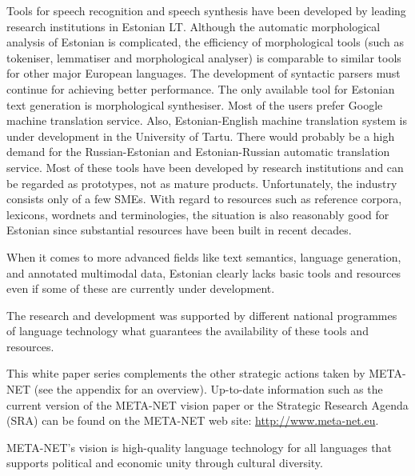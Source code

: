 \begin{multicols}{2}
Tools for speech recognition and speech synthesis have been developed by leading research institutions in Estonian LT.  Although the automatic morphological analysis of Estonian is complicated, the efficiency of morphological tools (such as tokeniser, lemmatiser and morphological analyser) is comparable to similar tools for other major European languages.  The development of syntactic parsers must continue for achieving better performance.  The only available tool for Estonian text generation is morphological synthesiser.  Most of the users prefer Google machine translation service. Also, Estonian-English machine translation system is under development in the University of Tartu. There would probably be a high demand for the Russian-Estonian and Estonian-Russian automatic translation service.  Most of these tools have been developed by research institutions and can be regarded as prototypes, not as mature products. Unfortunately, the industry consists only of a few SMEs.  With regard to resources such as reference corpora, lexicons, wordnets and terminologies, the situation is also reasonably good for Estonian since substantial resources have been built in recent decades.

When it comes to more advanced fields like text semantics, language generation, and annotated multimodal data, Estonian clearly lacks basic tools and resources even if some of these are currently under development.

The research and development was supported by different national programmes of language technology what guarantees the availability of these tools and resources.

This white paper series complements the other strategic actions taken by META-NET (see the appendix for an overview). Up-to-date information such as the current version of the META-NET vision paper \cite{Meta1} or the Strategic Research Agenda (SRA) can be found on the META-NET web site: \url{http://www.meta-net.eu}.

META-NET’s vision is high-quality language technology for all languages that supports political and economic unity through cultural diversity.
\end{multicols}

\clearpage


